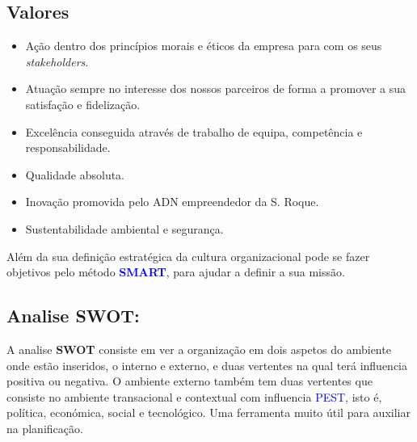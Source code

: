 \subsection{Valores}
\begin{itemize}
\setlength\itemsep{-0.3em}
\item Ação dentro dos princípios morais e éticos da empresa para com os seus \textit{stakeholders}.
\item Atuação sempre no interesse dos nossos parceiros de forma a promover a sua satisfação e fidelização.
\item Excelência conseguida através de trabalho de equipa, competência e responsabilidade.
\item Qualidade absoluta.
\item Inovação promovida pelo ADN empreendedor da S. Roque.
\item Sustentabilidade ambiental e segurança.
\end{itemize}\par
Além da sua definição estratégica da cultura organizacional pode se fazer objetivos pelo método \textcolor{blue}{\textbf{SMART}}, para ajudar a definir a sua missão.
\subsection{Analise SWOT:}
A analise \textbf{SWOT} consiste em ver a organização em dois aspetos do ambiente onde estão inseridos, o interno e externo, e duas vertentes na qual terá influencia positiva ou negativa. O ambiente externo também tem duas vertentes que consiste no ambiente transacional e contextual com influencia \textcolor{blue}{PEST}, isto é, política, económica, social e tecnológico. Uma ferramenta muito útil para auxiliar na planificação.

